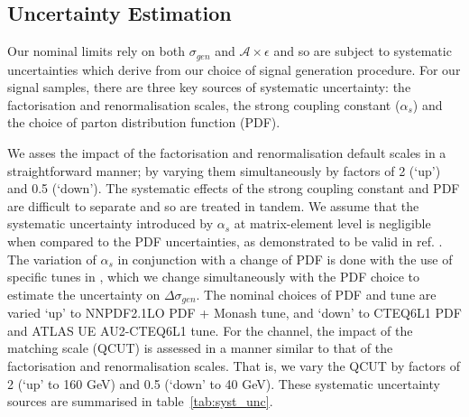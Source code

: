
\subsection{Uncertainty Estimation}
Our nominal limits rely on both $\sigma_{gen}$ and $\mathcal{A}\times\epsilon$ and so are subject to systematic uncertainties which derive from our choice of signal generation procedure. For our signal samples, there are three key sources of systematic uncertainty: the factorisation and renormalisation scales, the strong coupling constant ($\alpha_{s}$) and the choice of parton distribution function (PDF).

%
%
We asses the impact of the factorisation and renormalisation default scales in a straightforward manner; by varying them simultaneously by factors of 2 (`up') and 0.5 (`down'). The systematic effects of the strong coupling constant and PDF are difficult to separate and so are treated in tandem. We assume that the systematic uncertainty introduced by $\alpha_{s}$ at matrix-element level is negligible when compared to the PDF uncertainties, as demonstrated to be valid in ref. \cite{CERN-THESIS-2015-038}. The variation of $\alpha_{s}$ in conjunction with a change of PDF is done with the use of specific tunes in \PYTHIA, which we change simultaneously with the PDF choice to estimate the uncertainty on $\Delta \sigma_{gen}$. The nominal choices of PDF and tune are varied `up' to NNPDF2.1LO PDF + Monash tune, and `down' to CTEQ6L1 PDF and ATLAS UE AU2-CTEQ6L1 tune. For the \monojet channel, the impact of the matching scale (QCUT) is assessed in a manner similar to that of the factorisation and renormalisation scales. That is, we vary the QCUT by factors of 2 (`up' to 160 GeV) and 0.5 (`down' to 40 GeV). These systematic uncertainty sources are summarised in table~\ref{tab:syst_unc}.

